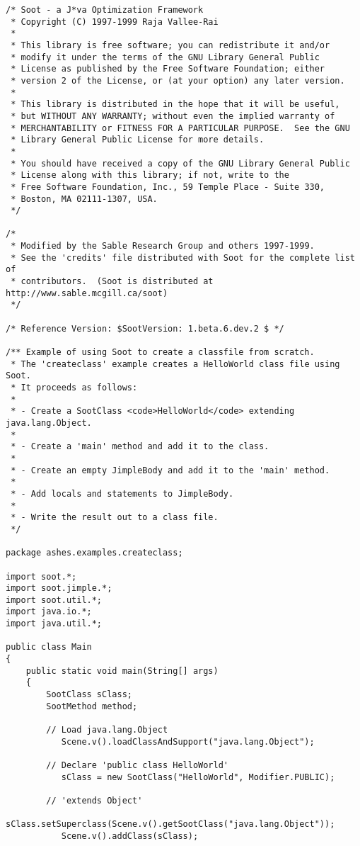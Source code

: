 \documentclass{article}
\begin{document}
\begin{verbatim}
/* Soot - a J*va Optimization Framework
 * Copyright (C) 1997-1999 Raja Vallee-Rai
 *
 * This library is free software; you can redistribute it and/or
 * modify it under the terms of the GNU Library General Public
 * License as published by the Free Software Foundation; either
 * version 2 of the License, or (at your option) any later version.
 *
 * This library is distributed in the hope that it will be useful,
 * but WITHOUT ANY WARRANTY; without even the implied warranty of
 * MERCHANTABILITY or FITNESS FOR A PARTICULAR PURPOSE.  See the GNU
 * Library General Public License for more details.
 *
 * You should have received a copy of the GNU Library General Public
 * License along with this library; if not, write to the
 * Free Software Foundation, Inc., 59 Temple Place - Suite 330,
 * Boston, MA 02111-1307, USA.
 */

/*
 * Modified by the Sable Research Group and others 1997-1999.  
 * See the 'credits' file distributed with Soot for the complete list of
 * contributors.  (Soot is distributed at http://www.sable.mcgill.ca/soot)
 */

/* Reference Version: $SootVersion: 1.beta.6.dev.2 $ */

/** Example of using Soot to create a classfile from scratch.
 * The 'createclass' example creates a HelloWorld class file using Soot.
 * It proceeds as follows:
 *
 * - Create a SootClass <code>HelloWorld</code> extending java.lang.Object.
 *
 * - Create a 'main' method and add it to the class.
 *
 * - Create an empty JimpleBody and add it to the 'main' method.
 *
 * - Add locals and statements to JimpleBody.
 *
 * - Write the result out to a class file.
 */

package ashes.examples.createclass;

import soot.*;
import soot.jimple.*;
import soot.util.*;
import java.io.*;
import java.util.*;

public class Main
{
    public static void main(String[] args)
    {
        SootClass sClass;
        SootMethod method;
        
        // Load java.lang.Object
           Scene.v().loadClassAndSupport("java.lang.Object");
           
        // Declare 'public class HelloWorld'   
           sClass = new SootClass("HelloWorld", Modifier.PUBLIC);
        
        // 'extends Object'
           sClass.setSuperclass(Scene.v().getSootClass("java.lang.Object"));
           Scene.v().addClass(sClass);
           

\end{verbatim}
\end{document}
